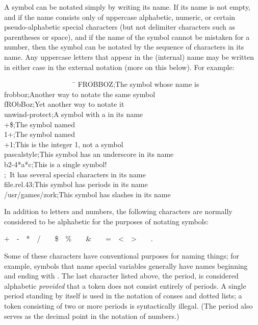 A symbol can be notated simply by writing its name.
If its name is not empty, and if the name consists only of
uppercase alphabetic, numeric, or certain pseudo-alphabetic
special characters (but not
delimiter characters such as parentheses or space), and if
the name of the symbol cannot be mistaken for a number, then
the symbol can be notated by the sequence of characters in its name.
Any uppercase letters that appear in the (internal) name may
be written in either case in the external notation (more on this below).
For example:
\begin{lisp}
~~~~~~~~~~~~~~~~~~~~\=\kill
FROBBOZ\>;\textrm{The symbol whose name is } \\
frobboz\>;\textrm{Another way to notate the same symbol} \\
fRObBoz\>;\textrm{Yet another way to notate it} \\
unwind-protect\>;\textrm{A symbol with a \cdf{-} in its name} \\
+\$\>;\textrm{The symbol named \cd{+\$}} \\
1+\>;\textrm{The symbol named } \\
+1\>;\textrm{This is the integer 1, not a symbol} \\
pascal{\Xunderscore}style\>;\textrm{This symbol has an underscore in its name} \\
b{\Xcircumflex}2-4*a*c\>;\textrm{This is a single symbol!} \\
\>;~\textrm{It has several special characters in its name} \\
file.rel.43\>;\textrm{This symbol has periods in its name} \\
/usr/games/zork\>;\textrm{This symbol has slashes in its name}
\end{lisp}

In addition to letters and numbers, the following characters are normally
considered to be alphabetic for the purposes of notating
symbols:
\begin{lisp}
+~~-~~*~~/~~{\Xatsign}~~\$~~\%~~{\Xcircumflex}~~\&~~{\Xunderscore}~~=~~<~~>~~{\Xtilde}~~.
\end{lisp}
Some of these characters have conventional purposes for naming things;
for example, symbols that name special variables
generally have names beginning and ending with
\cdf{*}.  The last character listed above, the period, is considered alphabetic
\emph{provided} that a token does not consist entirely of periods.
A single period standing by itself is used in the notation
of conses and dotted lists; a token consisting of two or more periods
is syntactically illegal.  (The period also serves as the decimal point
in the notation of numbers.)


